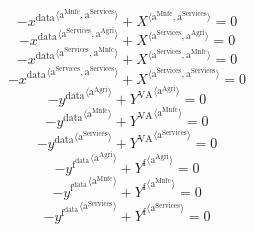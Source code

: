 \begin{equation}
-{x^{\mathrm{data}}}^{\langle \mathrm{\mathrm{a}^{\mathrm{Mnfc}}},\mathrm{\mathrm{a}^{\mathrm{Services}}}\rangle} + {X}^{\langle \mathrm{a}^{\mathrm{Mnfc}},\mathrm{a}^{\mathrm{Services}}\rangle} = 0
\end{equation}
\begin{equation}
-{x^{\mathrm{data}}}^{\langle \mathrm{\mathrm{a}^{\mathrm{Services}}},\mathrm{\mathrm{a}^{\mathrm{Agri}}}\rangle} + {X}^{\langle \mathrm{a}^{\mathrm{Services}},\mathrm{a}^{\mathrm{Agri}}\rangle} = 0
\end{equation}
\begin{equation}
-{x^{\mathrm{data}}}^{\langle \mathrm{\mathrm{a}^{\mathrm{Services}}},\mathrm{\mathrm{a}^{\mathrm{Mnfc}}}\rangle} + {X}^{\langle \mathrm{a}^{\mathrm{Services}},\mathrm{a}^{\mathrm{Mnfc}}\rangle} = 0
\end{equation}
\begin{equation}
-{x^{\mathrm{data}}}^{\langle \mathrm{\mathrm{a}^{\mathrm{Services}}},\mathrm{\mathrm{a}^{\mathrm{Services}}}\rangle} + {X}^{\langle \mathrm{a}^{\mathrm{Services}},\mathrm{a}^{\mathrm{Services}}\rangle} = 0
\end{equation}
\begin{equation}
-{y^{\mathrm{data}}}^{\langle \mathrm{\mathrm{a}^{\mathrm{Agri}}}\rangle} + {Y^{\mathrm{VA}}}^{\langle \mathrm{a}^{\mathrm{Agri}}\rangle} = 0
\end{equation}
\begin{equation}
-{y^{\mathrm{data}}}^{\langle \mathrm{\mathrm{a}^{\mathrm{Mnfc}}}\rangle} + {Y^{\mathrm{VA}}}^{\langle \mathrm{a}^{\mathrm{Mnfc}}\rangle} = 0
\end{equation}
\begin{equation}
-{y^{\mathrm{data}}}^{\langle \mathrm{\mathrm{a}^{\mathrm{Services}}}\rangle} + {Y^{\mathrm{VA}}}^{\langle \mathrm{a}^{\mathrm{Services}}\rangle} = 0
\end{equation}
\begin{equation}
-{y^{\mathrm{f}^{\mathrm{data}}}}^{\langle \mathrm{\mathrm{a}^{\mathrm{Agri}}}\rangle} + {Y^{\mathrm{f}}}^{\langle \mathrm{a}^{\mathrm{Agri}}\rangle} = 0
\end{equation}
\begin{equation}
-{y^{\mathrm{f}^{\mathrm{data}}}}^{\langle \mathrm{\mathrm{a}^{\mathrm{Mnfc}}}\rangle} + {Y^{\mathrm{f}}}^{\langle \mathrm{a}^{\mathrm{Mnfc}}\rangle} = 0
\end{equation}
\begin{equation}
-{y^{\mathrm{f}^{\mathrm{data}}}}^{\langle \mathrm{\mathrm{a}^{\mathrm{Services}}}\rangle} + {Y^{\mathrm{f}}}^{\langle \mathrm{a}^{\mathrm{Services}}\rangle} = 0
\end{equation}
